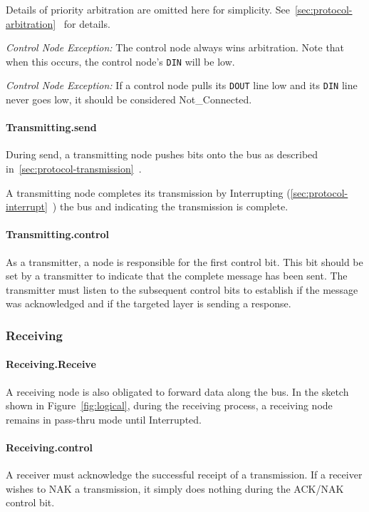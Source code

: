 Details of priority arbitration are omitted here for simplicity.
See~\ref{sec:protocol-arbitration}~ for
details.

\medskip
\noindent
{\em Control Node Exception:} The control node always wins arbitration. Note
that when this occurs, the control node's {\tt DIN} will be low.

\medskip
\noindent
{\em Control Node Exception:} If a control node pulls its {\tt DOUT} line low
and its {\tt DIN} line never goes low, it should be considered
{\sc Not\_Connected}.

\paragraph{Transmitting.{\sc send}}
During {\sc send}, a transmitting node pushes bits onto the bus as described
in~\ref{sec:protocol-transmission}~.

A transmitting node completes its transmission by Interrupting
(\ref{sec:protocol-interrupt}~) the bus and
indicating the transmission is complete.

\paragraph{Transmitting.{\sc control}}
As a transmitter, a node is responsible for the first control bit. This bit
should be set by a transmitter to indicate that the complete message has been
sent. The transmitter must listen to the subsequent control bits to establish
if the message was acknowledged and if the targeted layer is sending a
response.

\subsubsection{Receiving}

\paragraph{Receiving.{\sc Receive}}
A receiving node is also obligated to forward data along the bus. In the
sketch shown in Figure~\ref{fig:logical}, during the receiving process, a
receiving node remains in pass-thru mode until Interrupted.

\paragraph{Receiving.{\sc control}}
A receiver must acknowledge the successful receipt of a transmission. If a
receiver wishes to NAK a transmission, it simply does nothing during the
ACK/NAK control bit.

